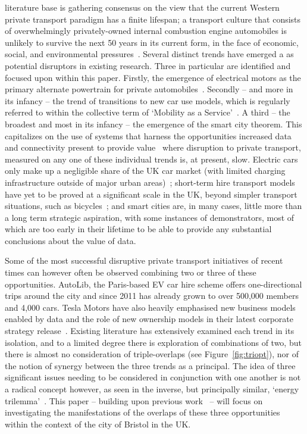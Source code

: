\documentclass[journal]{IEEEtran}
\begin{document}
 literature base is gathering consensus on
the view that the current Western private transport paradigm has a
finite lifespan; a transport culture that consists of overwhelmingly
privately-owned internal combustion engine automobiles is unlikely to
survive the next 50 years in its current form, in the face of
economic, social, and environmental
pressures~\cite{lerner:2011,van-audenhove-et-al:2014,black-et-al:2016}.
Several distinct trends have emerged a as potential disruptors in
existing research. Three in particular are identified and focused upon
within this paper.  Firstly, the emergence of electrical motors as the
primary alternate powertrain for private
automobiles~\cite{paffumi-et-al:2015,gnann-et-al:2015}.  Secondly --
and more in its infancy -- the trend of transitions to new car use
models, which is regularly referred to within the collective term of
`Mobility as a Service'~\cite{tscatapult:2016}. A third -- the
broadest and most in its infancy -- the emergence of the smart city
theorem. This capitalizes on the use of systems that harness the
opportunities increased data and connectivity present to provide
value~\cite{townsend:2013,ibm:2014} where disruption to private
transport, measured on any one of these individual trends is, at
present, slow. Electric cars only make up a negligible share of the UK
car market (with limited charging infrastructure outside of major
urban areas)~\cite{dft:2008}; short-term hire transport models have
yet to be proved at a significant scale in the UK, beyond simpler
transport situations, such as bicycles~\cite{kamargianni-et-al:2016};
and smart cities are, in many cases, little more than a long term
strategic aspiration, with some instances of demonstrators, most of
which are too early in their lifetime to be able to provide any
substantial conclusions about the value of data.

Some of the most successful disruptive private transport initiatives
of recent times can however often be observed combining two or three
of these opportunities. AutoLib, the Paris-based EV car hire scheme
offers one-directional trips around the city and since 2011 has
already grown to over 500,000 members and 4,000 cars. Tesla Motors
have also heavily emphasised new business models enabled by data and
the role of new ownership models in their latest corporate strategy
release~\cite{musk:2016}. Existing literature has extensively examined
each trend in its isolation, and to a limited degree there is
exploration of combinations of two, but there is almost no
consideration of triple-overlaps (see Figure~\ref{fig:triopt}), nor of
the notion of synergy between the three trends as a principal. The
idea of three significant issues needing to be considered in
conjunction with one another is not a radical concept however, as seen
in the inverse, but principally similar, `energy
trilemma'~\cite{wec:2015}. This paper -- building upon previous
work~\cite{cooper-et-al-sose:2015} -- will focus on investigating the
manifestations of the overlaps of these three opportunities within the
context of the city of Bristol in the UK.
\end{document}
